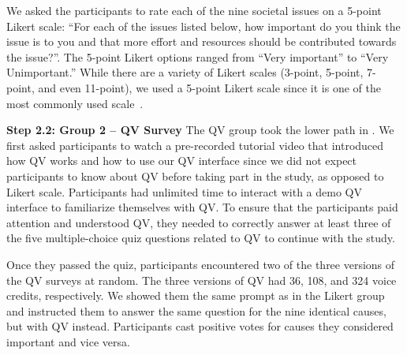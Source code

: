 We asked the participants to rate each of the nine societal issues on a 5-point Likert scale: ``For each of the issues listed below, how important do you think the issue is to you and that more effort and resources should be contributed towards the issue?''. The 5-point Likert options ranged from ``Very important'' to ``Very Unimportant.'' While there are a variety of Likert scales (3-point, 5-point, 7-point, and even 11-point), we used a 5-point Likert scale since it is one of the most commonly used scale~\cite{dawes2008data}.

\textbf{Step 2.2: Group 2 -- QV Survey} The QV group took the lower path in . We first asked participants to watch a pre-recorded tutorial video that introduced how QV works and how to use our QV interface since we did not expect participants to know about QV before taking part in the study, as opposed to Likert scale. Participants had unlimited time to interact with a demo QV interface to familiarize themselves with QV. To ensure that the participants paid attention and understood QV, they needed to correctly answer at least three of the five multiple-choice quiz questions related to QV to continue with the study.

Once they passed the quiz, participants encountered two of the three versions of the QV surveys at random. The three versions of QV had 36, 108, and 324 voice credits, respectively. We showed them the same prompt as in the Likert group and instructed them to answer the same question for the nine identical causes, but with QV instead. Participants cast positive votes for causes they considered important and vice versa.

